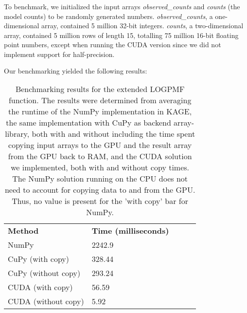 To benchmark, we initialized the input arrays \textit{observed\_counts} and \textit{counts} (the model counts) to be randomly generated numbers.
\textit{observed\_counts}, a one-dimensional array, contained 5 million 32-bit integers. 
\textit{counts}, a two-dimensional array, contained 5 million rows of length 15, totalling 75 million 16-bit floating point numbers, except when running the CUDA version since we did not implement support for half-precision.

Our benchmarking yielded the following results:
\begin{table}[H]
\begin{center}
\begin{tabular}{lllll}
\multicolumn{1}{l|}{\textbf{Method}} & \multicolumn{1}{l}{\textbf{Time (milliseconds)}} &  \\ \cline{1-2}
\multicolumn{1}{l|}{NumPy} & \multicolumn{1}{l}{2242.9} &  \\
\multicolumn{1}{l|}{CuPy (with copy)} & \multicolumn{1}{l}{328.44} & \\
\multicolumn{1}{l|}{CuPy (without copy)} & \multicolumn{1}{l}{293.24} & \\
\multicolumn{1}{l|}{CUDA (with copy)} & \multicolumn{1}{l}{56.59} & \\
\multicolumn{1}{l|}{CUDA (without copy)} & \multicolumn{1}{l}{5.92}
\end{tabular}
\end{center}
\caption{
  Benchmarking results for the extended LOGPMF function.
  The results were determined from averaging the runtime of the NumPy implementation in KAGE, the same implementation with CuPy as backend array-library, both with and without including the time spent copying input arrays to the GPU and the result array from the GPU back to RAM, and the CUDA solution we implemented, both with and without copy times.
  The NumPy solution running on the CPU does not need to account for copying data to and from the GPU. 
  Thus, no value is present for the 'with copy' bar for NumPy.
}
\label{methods:gpu_accelerating_genotyping:tables:extended_logpmf_benchmark}
\end{table}

